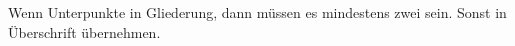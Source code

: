 Wenn Unterpunkte in Gliederung, dann müssen es mindestens zwei sein. Sonst in Überschrift übernehmen.